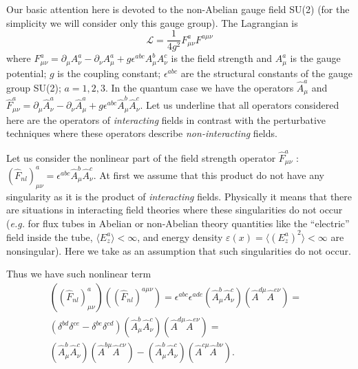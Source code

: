 \documentclass[a4paper,a4paper]{article}
\begin{document}
Our basic attention here is devoted to the non-Abelian gauge field 
SU(2) (for the simplicity we will consider only this gauge group). 
The Lagrangian is 
\begin{equation}
\mathcal L = \frac{1}{4g^2}F^a_{\mu \nu} F^{a\mu \nu}
\label{sec1-10}
\end{equation}
where $F^a_{\mu \nu} = \partial_\mu A^a_\nu - \partial_\nu A^a_\mu + 
g \epsilon^{abc}A^b_\mu A^c_\nu$ is the field strength and $A^a_\mu$ 
is the gauge potential; $g$ is the coupling constant; 
$\epsilon^{abc}$ are the structural constants of the  
gauge group SU(2); $a=1,2,3$. In the quantum case we have the operators 
$\hat A^a_\mu$ and $\hat F^a_{\mu \nu} = \partial_\mu \hat A^a_\nu - 
\partial_\nu \hat A^a_\mu + g \epsilon^{abc}\hat A^b_\mu \hat A^c_\nu$. 
Let us underline that all operators considered here are the operators 
of \textit{interacting} fields in contrast with the perturbative 
techniques where these operators describe \textit{non-interacting} 
fields. 
\par 
Let us consider the nonlinear part of the field strength operator  
$\hat F^a_{\mu \nu}$ : 
$(\hat F_{nl})^a_{\mu \nu} = \epsilon ^{abc} \hat A^b_\mu \hat A^c_\nu$. 
At first we assume 
that this product do not have any singularity as it is the product 
of \textit{interacting} fields. Physically 
it means that there are situations in interacting 
field theories where these singularities do not occur 
({\it e.g.} for flux tubes in Abelian or non-Abelian theory 
quantities like the ``electric'' field inside the tube, 
$\langle E^a_z \rangle < \infty$, and energy density 
$\varepsilon (x) = \langle (E^a_z)^2 \rangle < \infty$ are 
nonsingular). Here we take as an assumption that such singularities 
do not occur. 
\par 
Thus we have such nonlinear term 
\begin{equation}
\begin{split}
\left (
  \left (
    \hat F_{nl}
  \right )^a_{\mu\nu}
\right )
\left (
  \left (
    \hat F_{nl}
  \right )^{a\mu\nu}
\right ) = 
\epsilon^{abc} \epsilon ^{ade} 
\left (
\hat A^b_\mu \hat A^c_\nu
\right )
\left (
\hat A^{d\mu} \hat A^{e\nu}
\right ) = &\\
\left (
\delta^{bd} \delta^{ce} - \delta^{be}\delta^{cd}
\right )
\left (
\hat A^b_\mu \hat A^c_\nu
\right )
\left (
\hat A^{d\mu} \hat A^{e\nu}
\right ) = & \\ 
\left (
\hat A^b_\mu \hat A^c_\nu
\right )
\left (
\hat A^{b\mu} \hat A^{c\nu}
\right ) - 
\left (
\hat A^b_\mu \hat A^c_\nu
\right )
\left (
\hat A^{c\mu} \hat A^{b\nu}
\right ) . 
\label{sec1-20}
\end{split}
\end{equation}
\end{document}

